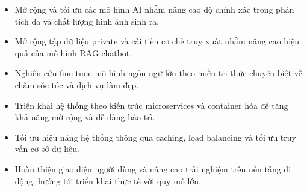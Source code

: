 \begin{itemize}
    \item Mở rộng và tối ưu các mô hình AI nhằm nâng cao độ chính xác trong phân tích da và chất lượng hình ảnh sinh ra.
    \item Mở rộng tập dữ liệu private và cải tiến cơ chế truy xuất nhằm nâng cao hiệu quả của mô hình RAG chatbot.
    \item Nghiên cứu fine-tune mô hình ngôn ngữ lớn theo miền tri thức chuyên biệt về chăm sóc tóc và dịch vụ làm đẹp.
    \item Triển khai hệ thống theo kiến trúc microservices và container hóa để tăng khả năng mở rộng và dễ dàng bảo trì.
    \item Tối ưu hiệu năng hệ thống thông qua caching, load balancing và tối ưu truy vấn cơ sở dữ liệu.
    \item Hoàn thiện giao diện người dùng và nâng cao trải nghiệm trên nền tảng di động, hướng tới triển khai thực tế với quy mô lớn.
\end{itemize}
